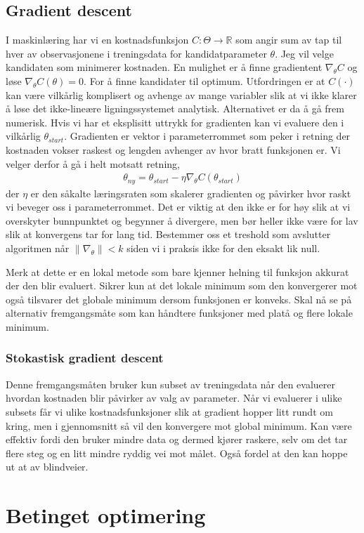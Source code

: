 \subsection{Gradient descent}
I maskinlæring har vi en kostnadsfunksjon $C:\Theta \to \mathbb{R}$ som angir sum av tap til hver av observasjonene i treningsdata for kandidatparameter $\theta$. Jeg vil velge kandidaten som minimerer kostnaden. En mulighet er å finne gradientent $\nabla_{\theta}C$ og løse $\nabla_{\theta}C(\theta)=0$. For å finne kandidater til optimum. Utfordringen er at $C(\cdot)$ kan være vilkårlig komplisert og avhenge av mange variabler slik at vi ikke klarer å løse det ikke-lineære ligningssystemet analytisk. Alternativet er da å gå frem numerisk. Hvis vi har et eksplisitt uttrykk for gradienten kan vi evaluere den i vilkårlig $\theta_{start}$. Gradienten er vektor i parameterrommet som peker i retning der kostnaden vokser raskest og lengden avhenger av hvor bratt funksjonen er. Vi velger derfor å gå i helt motsatt retning,
\begin{align}
\theta_{ny} = \theta_{start}-\eta\nabla_{\theta}C(\theta_{start})
\end{align}
der $\eta$ er den såkalte læringsraten som skalerer gradienten og påvirker hvor raskt vi beveger oss i parameterrommet. Det er viktig at den ikke er for høy slik at vi overskyter bunnpunktet og begynner å divergere, men bør heller ikke være for lav slik at konvergens tar for lang tid. Bestemmer oss et treshold som avslutter algoritmen når $\lVert \nabla_{\theta} \rVert <k$ siden vi i praksis ikke for den eksakt lik null. 

Merk at dette er en lokal metode som bare kjenner helning til funksjon akkurat der den blir evaluert. Sikrer kun at det lokale minimum som den konvergerer mot også tilsvarer det globale minimum dersom funksjonen er konveks. Skal nå se på alternativ fremgangsmåte som kan håndtere funksjoner med platå og flere lokale minimum.
\subsubsection{Stokastisk gradient descent}
Denne fremgangsmåten bruker kun subset av treningsdata når den evaluerer hvordan kostnaden blir påvirker av valg av parameter. Når vi evaluerer i ulike subsets får vi ulike kostnadsfunksjoner slik at gradient hopper litt rundt om kring, men i gjennomsnitt så vil den konvergere mot global minimum. Kan være effektiv fordi den bruker mindre data og dermed kjører raskere, selv om det tar flere steg og en litt mindre ryddig vei mot målet. Også fordel at den kan hoppe ut at av blindveier.
\section{Betinget optimering}
